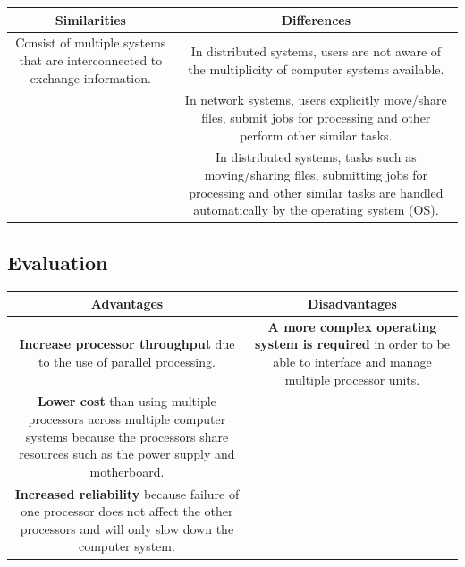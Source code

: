 \documentclass[a4paper]{systems-software}
\begin{document}
\begin{longtable}{|c|c|}
	\hline
	\textbf{Similarities} & \textbf{Differences} \\
	\hline
	\begin{minipage}[t]{0.45\textwidth}
		Consist of multiple systems that are interconnected to exchange information.
	\end{minipage}
	&
	\begin{minipage}[t]{0.45\textwidth}
		In distributed systems, users are not aware of the multiplicity of computer systems available.
	\end{minipage}
	\\ \hline
	&
	\begin{minipage}[t]{0.45\textwidth}
		In network systems, users explicitly move/share files, submit jobs for processing and other perform other similar tasks.
	\end{minipage}
	\\ \hline
	&
	\begin{minipage}[t]{0.45\textwidth}
		In distributed systems, tasks such as moving/sharing files, submitting jobs for processing and other similar tasks are handled automatically by the operating system (OS).
	\end{minipage}
	\\ \hline
\end{longtable}


\subsection*{Evaluation}

\begin{longtable}{|c|c|}
	\hline
	\textbf{Advantages} & \textbf{Disadvantages} \\
	\hline
	\begin{minipage}[t]{0.45\textwidth}
		\textbf{Increase processor throughput} due to the use of parallel processing.
	\end{minipage}
	&
	\begin{minipage}[t]{0.45\textwidth}
		\textbf{A more complex operating system is required} in order to be able to interface and manage multiple processor units.
	\end{minipage}
	\\ \hline
	\begin{minipage}[t]{0.45\textwidth}
		\textbf{Lower cost} than using multiple processors across multiple computer systems because the processors share resources such as the power supply and motherboard.
	\end{minipage}
	&
	\\ \hline
	\begin{minipage}[t]{0.45\textwidth}
		\textbf{Increased reliability} because failure of one processor does not affect the other processors and will only slow down the computer system.
	\end{minipage}
	&
	\\ \hline
\end{longtable}
\end{document}
